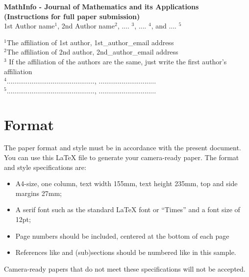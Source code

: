 \documentclass[12pt]{article}
\begin{document}
\baselineskip 12pt

\begin{center}
\textbf{\Large MathInfo - Journal of Mathematics and its Applications \\ (Instructions for full paper submission)} \\

\vspace{1.5cc}
{ \sc 1st Author name$^{1}$, 2nd Author name$^{2}$, .... $^{3}$, .... $^{4}$, and .... $^{5}$}\\

\vspace{0.3 cm}

{\small $^{1}$The affiliation  of 1st author, 1st\_author\_email address\\ $^{2}$The affiliation  of 2nd author, 2nd\_author\_email address\\
$^{3}$ If the affiliation  of the authors are the same, just write the first author's affiliation\\
$^{4}$.............................................., ..............................\\
$^{5}$.............................................., ..............................}
 \end{center}
\vspace{1.5cc}

\begin{abstract}
  
oindent  This paper is a sample prepared to illustrate the use of the  \LaTeX{} document to be published in MathInfo - Journal of Mathematics and its Applications.

\vspace{0.95cc}
\parbox{24cc}{{\it Key words and Phrases}:%
}
\end{abstract}

\section{Format} \label{form}
The paper format and style must be in accordance with the present document. You can use
this \LaTeX{} file to generate your camera-ready paper. The format and style
specifications are:
\begin{itemize}
\item A4-size, one column, text width 155mm, text height 235mm, top and side margins
27mm;
\item A serif font such as the standard \LaTeX{} font or ``Times'' and a font size
of 12pt;
\item Page numbers should be included, centered at the bottom of each page
\item References like \cite{ex} and (sub)sections should be numbered like in this sample.
\end{itemize}
Camera-ready papers that do not meet these specifications will not be accepted.
\end{document}
